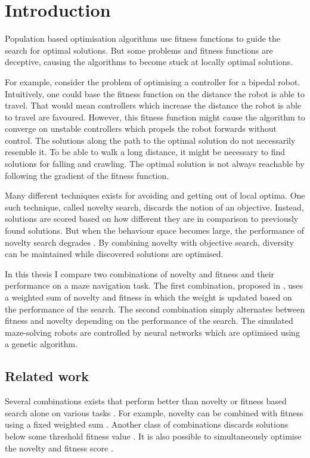 \section{Introduction}

\label{sec:intro}

Population based optimisation algorithms use fitness functions to guide the search for optimal solutions.
But some problems and fitness functions are deceptive, causing the algorithms to become stuck at
locally optimal solutions.

For example, consider the problem of optimising a controller for a bipedal
robot. Intuitively, one could base the fitness function on the distance the robot is able to travel.
That would mean controllers which increase the distance the robot is able to travel are favoured.
However, this fitness function might cause the algorithm to converge on unstable controllers which
propels the robot forwards without control. The solutions along the path to the optimal solution
do not necessarily resemble it. To be able to walk a long distance, it might be necessary to find
solutions for falling and crawling. The optimal solution is not always reachable by following
the gradient of the fitness function.

Many different techniques exists for avoiding and getting out of local optima. One such technique, called
novelty search, discards the notion of an objective. Instead, solutions are scored based on how different
they are in comparison to previously found solutions. But when the behaviour space becomes large, the performance
of novelty search degrades \cite{novelty_not_enough}. By combining novelty with objective search, diversity
can be maintained while discovered solutions are optimised.

In this thesis I compare two combinations of novelty and fitness and their performance
on a maze navigation task. The first combination, proposed in \cite{novelty_not_enough}, uses a weighted
sum of novelty and fitness in which the weight is updated based on the performance of the search.
The second combination simply alternates between fitness and novelty depending on the performance
of the search. The simulated maze-solving robots are controlled by neural networks which are
optimised using a genetic algorithm.

\subsection{Related work}
Several combinations exists that perform better than novelty or fitness based search alone
on various tasks \cite{ns_study}. For example, novelty can be combined with fitness using a
fixed weighted sum \cite{novelty_not_enough}. Another class of combinations discards solutions below
some threshold fitness value \cite{minimal_ns}. It is also possible to simultaneously optimise
the novelty and fitness score \cite{multi_ns}.
